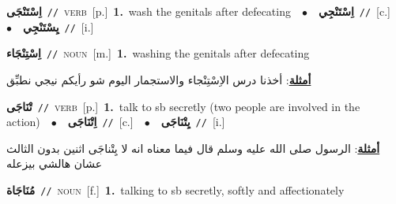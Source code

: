 \documentclass[10pt,a4paper,twoside]{article} %
\begin{document}
\begin{multicols}{2}
{\setlength\topsep{0pt}\textbf{\foreignlanguage{arabic}{اِسْتَنْجَى}}\ {\color{gray}\texttt{//}\color{black}}\ \textsc{verb}\ [p.]\ \textbf{1.}~wash the genitals after defecating\ \ $\bullet$\ \ \setlength\topsep{0pt}\textbf{\foreignlanguage{arabic}{اِسْتَنْجِي}}\ {\color{gray}\texttt{//}\color{black}}\ [c.]\ \ $\bullet$\ \ \setlength\topsep{0pt}\textbf{\foreignlanguage{arabic}{يِسْتَنْجِي}}\ {\color{gray}\texttt{//}\color{black}}\ [i.]\ } \vspace{2mm}

{\setlength\topsep{0pt}\textbf{\foreignlanguage{arabic}{اِسْتِنْجَاء}}\ {\color{gray}\texttt{//}\color{black}}\ \textsc{noun}\ [m.]\ \textbf{1.}~washing the genitals after defecating\  \begin{flushright}\color{gray}\foreignlanguage{arabic}{\textbf{\underline{\foreignlanguage{arabic}{أمثلة}}}: أخذنا درس الاِسْتِنْجاء والاستجمار اليوم شو رأيكم نيجي نطبِّق}\end{flushright}\color{black}} \vspace{2mm}

{\setlength\topsep{0pt}\textbf{\foreignlanguage{arabic}{تْنَاجَى}}\ {\color{gray}\texttt{//}\color{black}}\ \textsc{verb}\ [p.]\ \textbf{1.}~talk to sb secretly (two people are involved in the action)\ \ $\bullet$\ \ \setlength\topsep{0pt}\textbf{\foreignlanguage{arabic}{اِتْنَاجَى}}\ {\color{gray}\texttt{//}\color{black}}\ [c.]\ \ $\bullet$\ \ \setlength\topsep{0pt}\textbf{\foreignlanguage{arabic}{يِتْنَاجَى}}\ {\color{gray}\texttt{//}\color{black}}\ [i.]\  \begin{flushright}\color{gray}\foreignlanguage{arabic}{\textbf{\underline{\foreignlanguage{arabic}{أمثلة}}}: الرسول صلى الله عليه وسلم قال فيما معناه انه لا يِتْناجَى اثنين بدون الثالث عشان هالشي بيزعله}\end{flushright}\color{black}} \vspace{2mm}

{\setlength\topsep{0pt}\textbf{\foreignlanguage{arabic}{مُنَاجَاة}}\ {\color{gray}\texttt{//}\color{black}}\ \textsc{noun}\ [f.]\ \textbf{1.}~talking to sb secretly, softly and affectionately\ } \vspace{2mm}


\end{multicols}
\end{document}
